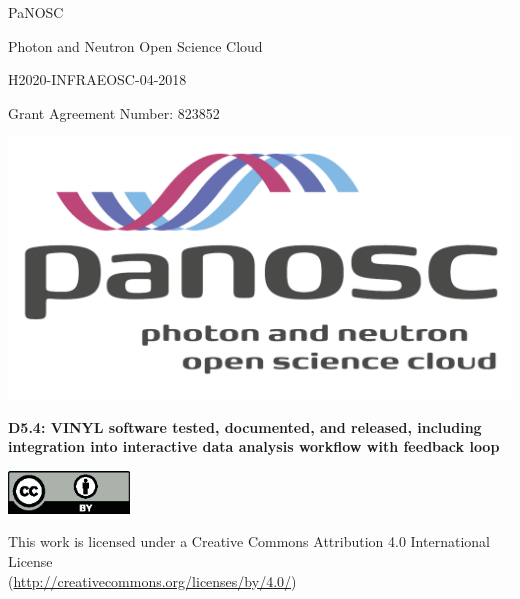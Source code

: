 \documentclass[11pt, a4paper]{article}
\begin{document}

{
	\centering
    \begin{onehalfspace}
    \sffamily
     \vspace*{5ex}
	{\fontsize{20}{24}\selectfont PaNOSC \par}
	{\fontsize{20}{24}\selectfont Photon and Neutron Open Science Cloud \par}
	{\fontsize{20}{24}\selectfont H2020-INFRAEOSC-04-2018 \par}
	{\fontsize{20}{24}\selectfont Grant Agreement Number: 823852 \par}
	\end{onehalfspace}

	\vspace*{7ex}
	\includegraphics[width=\textwidth]{PaNOSClogo_web_RGB.pdf}\par
	\vfill
	{\large \textbf{\sffamily D5.4: VINYL software tested, documented, and released, including integration into interactive data analysis workflow with feedback loop}}\par
} %


\includegraphics[width=1.27in]{by.eps}\par
This work is licensed under a Creative Commons Attribution 4.0 International License\\
(\url{http://creativecommons.org/licenses/by/4.0/})\par
\end{document}
